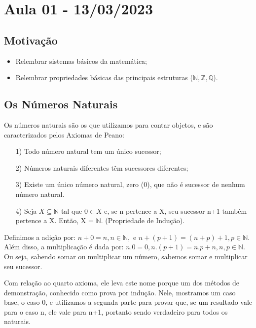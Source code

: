 \documentclass[analysis_notes.tex]{subfiles}
\begin{document}
\section{Aula 01 - 13/03/2023}
\subsection{Motiva\c c\~ao}
\begin{itemize}
	\item Relembrar sistemas b\'asicos da matem\'atica;
	\item Relembrar propriedades b\'asicas das principais estruturas ($\mathbb{N}, \mathbb{Z}, \mathbb{Q}$).
\end{itemize}

\subsection{Os N\'umeros Naturais}
Os n\'umeros naturais s\~ao os que utilizamos para contar objetos, e s\~ao caracterizados pelos Axiomas de Peano:
\begin{itemize}
	\item[1)] Todo n\'umero natural tem um \'unico sucessor;
	\item[2)] N\'umeros naturais diferentes t\^em sucessores diferentes;
	\item[3)] Existe um \'unico n\'umero natural, zero (0), que n\~ao \'e sucessor de nenhum n\'umero natural.
	\item[4)] Seja $X \subseteq{\mathbb{N}}$ tal que $0\in{X}$ e, se n pertence a X, seu sucessor n+1 tamb\'em pertence
	      a X. Ent\~ao, X = $\mathbb{N}.$ (Propriedade de Indu\c c\~ao).
\end{itemize}

\begin{def*}
	Definimos a adi\c c\~ao por: $n + 0 = n, n\in \mathbb{N},\text{ e }n+(p+1) = (n+p)+1, p\in{\mathbb{N}}$. Al\'em disso,
	a multiplica\c c\~ao \'e dada por: $n.0 = 0, n.(p+1) = n.p + n, n, p\in\mathbb{N}.$ Ou seja, sabendo somar ou multiplicar um n\'umero,
	sabemos somar e multiplicar seu sucessor.
\end{def*}
Com rela\c c\~ao ao quarto axioma, ele leva este nome porque um dos m\'etodos de demonstra\c c\~ao, conhecido como
prova por indu\c c\~ao. Nele, mostramos um caso base, o caso 0, e utilizamos a segunda parte para provar que, se um
resultado vale para o caso n, ele vale para n+1, portanto sendo verdadeiro para todos os naturais.
\end{document}
